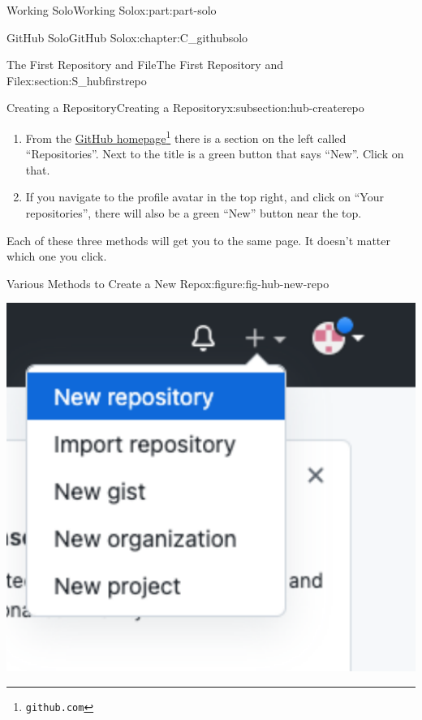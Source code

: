 \documentclass[oneside,10pt,]{book}
\begin{document}
\begin{partptx}{Working Solo}{}{Working Solo}{}{}{x:part:part-solo}
\begin{chapterptx}{GitHub Solo}{}{GitHub Solo}{}{}{x:chapter:C_githubsolo}
\begin{sectionptx}{The First Repository and File}{}{The First Repository and File}{}{}{x:section:S_hubfirstrepo}
\begin{subsectionptx}{Creating a Repository}{}{Creating a Repository}{}{}{x:subsection:hub-createrepo}
\begin{enumerate}
\par
Note: GitHub differentiates bewteen a repository and a project. Don't get confused. We want repository (and you will want that for most purposes).%
\item{}From the \href{https://github.com}{GitHub homepage}\footnote{\nolinkurl{github.com}\label{g:fn:idp615735704}} there is a section on the left called ``Repositories''. Next to the title is a green button that says ``New''. Click on that.%
\item{}If you navigate to the profile avatar in the top right, and click on ``Your repositories'', there will also be a green ``New'' button near the top.%
\end{enumerate}
Each of these three methods will get you to the same page. It doesn't matter which one you click.%
\begin{figureptx}{Various Methods to Create a New Repo}{x:figure:fig-hub-new-repo}{}%
\begin{sidebyside}{2}{0.025}{0.025}{0.05}%
\begin{sbspanel}{0.45}%
\includegraphics[width=\linewidth]{external/hub_new_repo_navbar.pdf}
\end{sbspanel}%
\begin{sbspanel}{0.45}%

\end{sbspanel}
\end{sidebyside}
\end{figureptx}
\end{subsectionptx}
\end{sectionptx}
\end{chapterptx}
\end{partptx}
\end{document}
